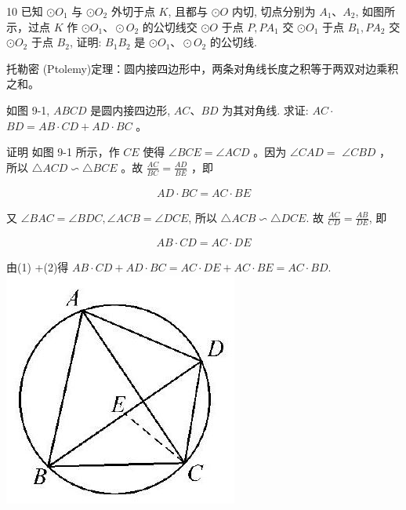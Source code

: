 \documentclass[10pt]{article}
\begin{document}
10 已知 $\odot O_{1}$ 与 $\odot O_{2}$ 外切于点 $K$, 且都与 $\odot O$ 内切, 切点分别为 $A_{1} 、 A_{2}$, 如图所示，过点 $K$ 作 $\odot O_{1} 、 \odot O_{2}$ 的公切线交 $\odot O$ 于点 $P, P A_{1}$ 交 $\odot O_{1}$ 于点 $B_{1}, P A_{2}$ 交 $\odot O_{2}$ 于点 $B_{2}$, 证明: $B_{1} B_{2}$ 是 $\odot O_{1} 、 \odot O_{2}$ 的公切线.

托勒密 (Ptolemy)定理：圆内接四边形中，两条对角线长度之积等于两双对边乘积之和。

如图 9-1, $A B C D$ 是圆内接四边形, $A C 、 B D$ 为其对角线. 求证: $A C \cdot$ $B D=A B \cdot C D+A D \cdot B C$ 。

证明 如图 9-1 所示，作 $C E$ 使得 $\angle B C E=\angle A C D$ 。因为 $\angle C A D=$ $\angle C B D$ ，所以 $\triangle A C D \backsim \triangle B C E$ 。故 $\frac{A C}{B C}=\frac{A D}{B E}$ ，即

\begin{align*}
A D \cdot B C=A C \cdot B E \tag{1}
\end{align*}

又 $\angle B A C=\angle B D C, \angle A C B=\angle D C E$, 所以 $\triangle A C B \backsim \triangle D C E$. 故 $\frac{A C}{C D}=\frac{A B}{D E}$, 即

\begin{align*}
A B \cdot C D=A C \cdot D E \tag{2}
\end{align*}

由(1) +(2)得 $A B \cdot C D+A D \cdot B C=A C \cdot D E+A C \cdot B E=A C \cdot B D$.\\
\includegraphics[max width=\textwidth, center]{2024_10_30_66b8e5e701da2093c133g-065(1)}
\end{document}
